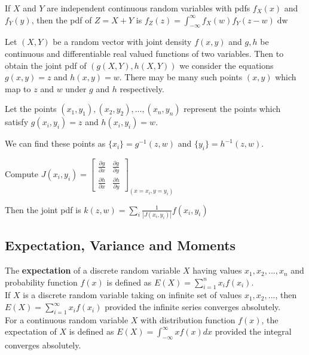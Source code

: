 \begin{thm}
    If $X$ and $Y$ are independent continuous random variables with pdfs $f_X(x)$ and $f_Y(y)$, then the pdf of $Z = X+Y$ is $f_Z\left (z\right ) = \displaystyle\int_{- \infty}^\infty f_X \left (w\right ) f_Y \left (z - w\right ) \mathop{\mathrm{d} w}$
\end{thm}

\begin{prop}
    Let $(X,Y)$ be a random vector with joint density $f(x,y)$ and $g,h$ be continuous and differentiable real valued functions of two variables. Then to obtain the joint pdf of $(g(X,Y), h(X,Y))$ we consider the equations $g(x,y) = z$ and $h(x,y) = w$. There may be many such points $(x,y)$ which map to $z$ and $w$ under $g$ and $h$ respectively.

    Let the points $(x_1, y_1), (x_2, y_2), ..., (x_n, y_n)$ represent the points which satisfy $g(x_i, y_i) = z$ and $h(x_i, y_i) = w$.

    We can find these points as $\{x_i\} = g^{-1}(z,w)$ and $\{ y_i \} = h^{-1}(z,w)$.

    Compute $J(x_i, y_i) = \begin{bmatrix} \frac{\partial g}{\partial x} & \frac{\partial g}{\partial y} \\ \frac{\partial h}{\partial x} & \frac{\partial h}{\partial y} \end{bmatrix}_{(x = x_i, y = y_i)}$

        Then the joint pdf is $k(z,w) = \displaystyle \sum_i \frac{1}{|J(x_i, y_i)|} f(x_i, y_i)$
\end{prop}

\subsection{Expectation, Variance and Moments}

\begin{defn}
    The \textbf{expectation} of a discrete random variable $X$ having values $x_1, x_2, ..., x_n$ and probability function $f(x)$ is defined as $E\left (X\right ) = \sum_{i=1}^n x_i f\left (x_i\right )$.
    \\

    If $X$ is a discrete random variable taking on infinite set of values $x_1, x_2, ...$, then $E(X) = \sum_{i=1}^\infty x_i f(x_i)$ provided the infinite series converges absolutely.
    \\

    For a continuous random variable $X$ with distribution function $f(x)$, the expectation of $X$ is defined as $E(X) = \int_{- \infty}^\infty x f(x) dx$ provided the integral converges absolutely.
\end{defn}



